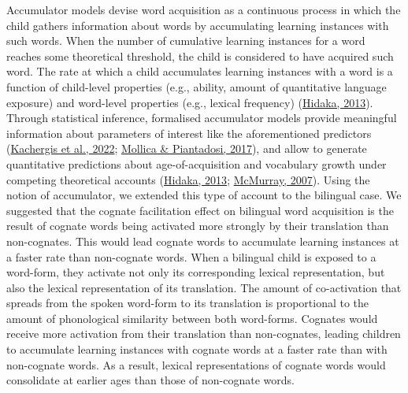 \documentclass[
]{article}
\begin{document}
Accumulator models devise word acquisition as a continuous process in
which the child gathers information about words by accumulating learning
instances with such words. When the number of cumulative learning
instances for a word reaches some theoretical threshold, the child is
considered to have acquired such word. The rate at which a child
accumulates learning instances with a word is a function of child-level
properties (e.g., ability, amount of quantitative language exposure) and
word-level properties (e.g., lexical frequency)
(\protect\hyperlink{ref-hidaka2013computational}{Hidaka, 2013}). Through
statistical inference, formalised accumulator models provide meaningful
information about parameters of interest like the aforementioned
predictors (\protect\hyperlink{ref-kachergis2022standard}{Kachergis et
al., 2022}; \protect\hyperlink{ref-mollica2017how}{Mollica \&
Piantadosi, 2017}), and allow to generate quantitative predictions about
age-of-acquisition and vocabulary growth under competing theoretical
accounts (\protect\hyperlink{ref-hidaka2013computational}{Hidaka, 2013};
\protect\hyperlink{ref-mcmurray2007defusing}{McMurray, 2007}). Using the
notion of accumulator, we extended this type of account to the bilingual
case. We suggested that the cognate facilitation effect on bilingual
word acquisition is the result of cognate words being activated more
strongly by their translation than non-cognates. This would lead cognate
words to accumulate learning instances at a faster rate than non-cognate
words. When a bilingual child is exposed to a word-form, they activate
not only its corresponding lexical representation, but also the lexical
representation of its translation. The amount of co-activation that
spreads from the spoken word-form to its translation is proportional to
the amount of phonological similarity between both word-forms. Cognates
would receive more activation from their translation than non-cognates,
leading children to accumulate learning instances with cognate words at
a faster rate than with non-cognate words. As a result, lexical
representations of cognate words would consolidate at earlier ages than
those of non-cognate words.
\end{document}
